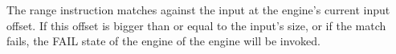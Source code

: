 The range instruction matches against the input at the engine's current input
offset. If this offset is bigger than or equal to the input's size, or if
the match fails, the FAIL state of the engine of the engine will be invoked.
